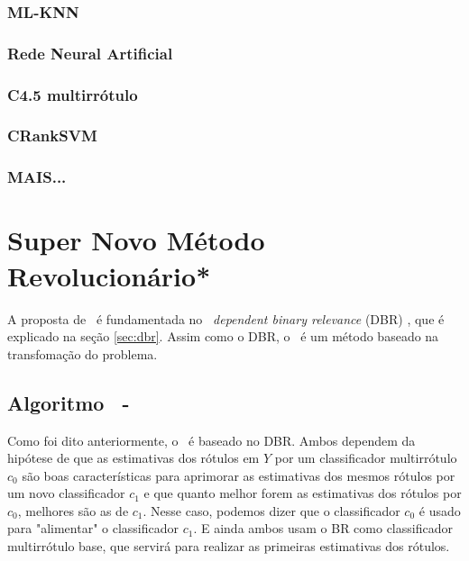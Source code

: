 \subsection{ML-KNN}
\subsection{Rede Neural Artificial}
\subsection{C4.5 multirrótulo}
\subsection{CRankSVM}
\subsection{MAIS...}


\chapter{Super Novo Método Revolucionário*}
A proposta de \MRLM~é fundamentada no \MML~\textit{dependent binary relevance} (DBR) \cite{dbr2014}, que é explicado
na seção \ref{sec:dbr}. Assim como o DBR, o \MRLMa~é um método baseado na transfomação do problema.


\section{Algoritmo \MRLM~-~\MRLMa}
Como foi dito anteriormente, o \MRLM~é baseado no DBR. 
Ambos dependem da hipótese de que as estimativas dos rótulos em $Y$ por um classificador multirrótulo $c_0$
são boas características para aprimorar as estimativas dos mesmos rótulos por um novo classificador $c_1$
e que quanto melhor forem as estimativas dos rótulos por $c_0$, melhores são as de $c_1$. Nesse caso, podemos dizer
que o classificador $c_0$ é usado para "alimentar" o classificador $c_1$.
E ainda ambos usam o BR como classificador multirrótulo base, que servirá para realizar as primeiras estimativas dos 
rótulos.

